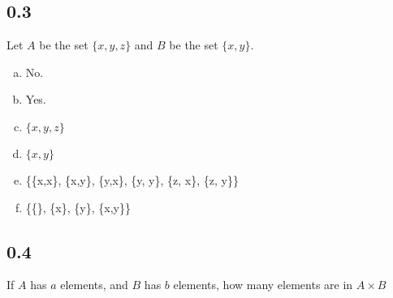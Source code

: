 \documentclass[11pt]{article}
\begin{document}
\subsection*{0.3}
Let $A$ be the set $\{x, y, z\}$ and $B$ be the set $\{x, y\}$.

\begin{enumerate}[a.]
\item No.
\item Yes.
\item $\{x, y, z\}$
\item $\{x, y\}$
\item \{\{x,x\}, \{x,y\}, \{y,x\}, \{y, y\}, \{z, x\}, \{z, y\}\}
\item \{\{\}, \{x\}, \{y\}, \{x,y\}\}
\end{enumerate}

\subsection*{0.4}
If $A$ has $a$ elements, and $B$ has $b$ elements, how many elements are in $A \times B$
\end{document}
